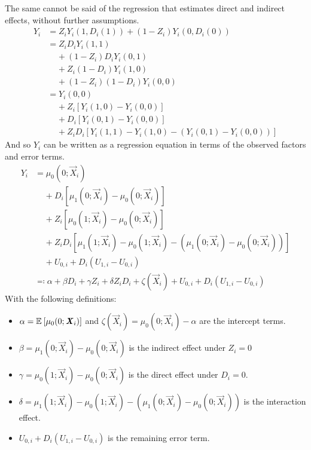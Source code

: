The same cannot be said of the regression that estimates direct and indirect effects, without further assumptions.
\begin{align*}
    Y_i &= Z_i Y_i(1, D_i(1)) + (1 - Z_i) Y_i(0, D_i(0)) \\
        &= Z_i D_i Y_i(1, 1) \\
        & \;\;\;\; + (1 - Z_i) D_i Y_i(0, 1) \\
        & \;\;\;\; + Z_i (1 - D_i) Y_i(1, 0) \\
        & \;\;\;\; + (1 - Z_i) (1 - D_i) Y_i(0, 0) \\
        &= Y_i(0, 0) \\
        & \;\;\;\; + Z_i \left[Y_i(1, 0) - Y_i(0, 0) \right] \\
        & \;\;\;\; + D_i \left[Y_i(0, 1) - Y_i(0, 0) \right] \\
        & \;\;\;\; + Z_i D_i \left[Y_i(1, 1) - Y_i(1, 0)
            - \left( Y_i(0, 1) - Y_i(0, 0) \right)\right]
\end{align*}
And so $Y_i$ can be written as a regression equation in terms of the observed factors and error terms.
\begin{align*}
    Y_i &= \mu_0(0; \vec X_i) \\
        & \;\;\;\; + D_i \left[\mu_1(0; \vec X_i) - \mu_0(0; \vec X_i) \right] \\
        & \;\;\;\; + Z_i \left[\mu_0(1; \vec X_i) - \mu_0(0; \vec X_i) \right] \\
        & \;\;\;\; + Z_i D_i \left[\mu_1(1; \vec X_i) - \mu_0(1; \vec X_i)
            - \left( \mu_1(0; \vec X_i) - \mu_0(0; \vec X_i) \right)\right] \\
        & \;\;\;\; + U_{0,i} + D_i \left( U_{1,i} - U_{0,i} \right) \\
        &\eqqcolon
            \alpha + \beta D_i + \gamma Z_i + \delta Z_i D_i
            + \zeta(\vec X_i)
            + U_{0,i} + D_i \left( U_{1,i} - U_{0,i} \right)
\end{align*}
With the following definitions:
\begin{itemize}
    \item $\alpha = \mathbb{E}_{} \left[ \mu_0(0; \boldsymbol{\mathit{X}}_i) \right]$ and $\zeta(\vec X_i) = \mu_0(0; \vec X_i) - \alpha$ are the intercept terms.
    \item $\beta = \mu_1(0; \vec X_i) - \mu_0(0; \vec X_i)$ is the indirect effect under $Z_i = 0$
    \item $\gamma = \mu_0(1; \vec X_i) - \mu_0(0; \vec X_i)$ is the direct effect under $D_i = 0$.
    \item $\delta = \mu_1(1; \vec X_i) - \mu_0(1; \vec X_i)- \left( \mu_1(0; \vec X_i) - \mu_0(0; \vec X_i) \right)$ is the interaction effect.
    \item $U_{0,i} + D_i \left( U_{1,i} - U_{0,i} \right)$ is the remaining error term.
\end{itemize}
